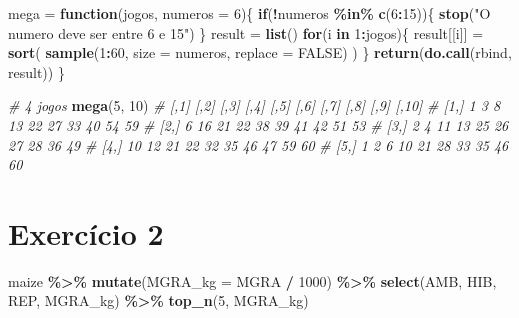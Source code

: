 \documentclass[
]{book}
\newenvironment{Shaded}{\begin{snugshade}}{\end{snugshade}}
\newcommand{\CommentTok}[1]{\textcolor[rgb]{0.56,0.35,0.01}{\textit{#1}}}
\newcommand{\ControlFlowTok}[1]{\textcolor[rgb]{0.13,0.29,0.53}{\textbf{#1}}}
\newcommand{\DataTypeTok}[1]{\textcolor[rgb]{0.13,0.29,0.53}{#1}}
\newcommand{\DecValTok}[1]{\textcolor[rgb]{0.00,0.00,0.81}{#1}}
\newcommand{\KeywordTok}[1]{\textcolor[rgb]{0.13,0.29,0.53}{\textbf{#1}}}
\newcommand{\NormalTok}[1]{#1}
\newcommand{\OperatorTok}[1]{\textcolor[rgb]{0.81,0.36,0.00}{\textbf{#1}}}
\newcommand{\OtherTok}[1]{\textcolor[rgb]{0.56,0.35,0.01}{#1}}
\newcommand{\StringTok}[1]{\textcolor[rgb]{0.31,0.60,0.02}{#1}}
\numberwithin{equation}{section}
\begin{document}
\begin{Shaded}
\begin{Highlighting}[]
\NormalTok{mega =}\StringTok{ }\ControlFlowTok{function}\NormalTok{(jogos, }\DataTypeTok{numeros =} \DecValTok{6}\NormalTok{)\{}
  \ControlFlowTok{if}\NormalTok{(}\OperatorTok{!}\NormalTok{numeros }\OperatorTok{\%in\%}\StringTok{ }\KeywordTok{c}\NormalTok{(}\DecValTok{6}\OperatorTok{:}\DecValTok{15}\NormalTok{))\{}
    \KeywordTok{stop}\NormalTok{(}\StringTok{"O numero deve ser entre 6 e 15"}\NormalTok{)}
\NormalTok{  \}}
\NormalTok{  result =}\StringTok{ }\KeywordTok{list}\NormalTok{()}
\ControlFlowTok{for}\NormalTok{(i }\ControlFlowTok{in} \DecValTok{1}\OperatorTok{:}\NormalTok{jogos)\{}
\NormalTok{result[[i]] =}\StringTok{ }\KeywordTok{sort}\NormalTok{(}
  \KeywordTok{sample}\NormalTok{(}\DecValTok{1}\OperatorTok{:}\DecValTok{60}\NormalTok{, }\DataTypeTok{size =}\NormalTok{ numeros, }\DataTypeTok{replace =} \OtherTok{FALSE}\NormalTok{)}
\NormalTok{  )}
\NormalTok{\}}
  \KeywordTok{return}\NormalTok{(}\KeywordTok{do.call}\NormalTok{(rbind, result))}
\NormalTok{\}}

\CommentTok{\# 4 jogos}
\KeywordTok{mega}\NormalTok{(}\DecValTok{5}\NormalTok{, }\DecValTok{10}\NormalTok{)}
\CommentTok{\#      [,1] [,2] [,3] [,4] [,5] [,6] [,7] [,8] [,9] [,10]}
\CommentTok{\# [1,]    1    3    8   13   22   27   33   40   54    59}
\CommentTok{\# [2,]    6   16   21   22   38   39   41   42   51    53}
\CommentTok{\# [3,]    2    4   11   13   25   26   27   28   36    49}
\CommentTok{\# [4,]   10   12   21   22   32   35   46   47   59    60}
\CommentTok{\# [5,]    1    2    6   10   21   28   33   35   46    60}
\end{Highlighting}
\end{Shaded}

\hypertarget{exerc2}{%
\section{Exercício 2}\label{exerc2}}

\begin{Shaded}
\begin{Highlighting}[]
\NormalTok{maize }\OperatorTok{\%\textgreater{}\%}
\StringTok{  }\KeywordTok{mutate}\NormalTok{(}\DataTypeTok{MGRA\_kg =}\NormalTok{ MGRA }\OperatorTok{/}\StringTok{ }\DecValTok{1000}\NormalTok{) }\OperatorTok{\%\textgreater{}\%}
\StringTok{  }\KeywordTok{select}\NormalTok{(AMB, HIB, REP, MGRA\_kg) }\OperatorTok{\%\textgreater{}\%}
\StringTok{  }\KeywordTok{top\_n}\NormalTok{(}\DecValTok{5}\NormalTok{, MGRA\_kg)}
\end{Highlighting}
\end{Shaded}
\end{document}
